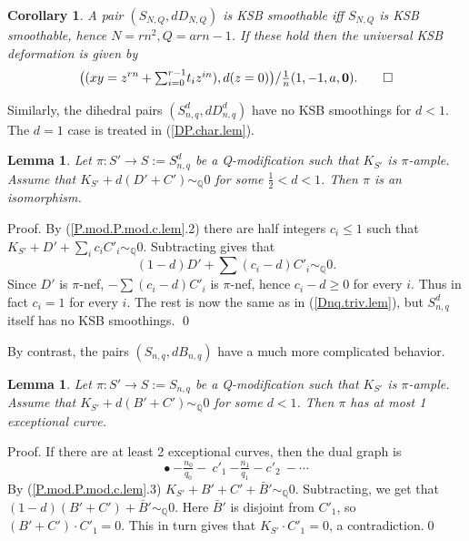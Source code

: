 \documentclass{amsart}
\newtheorem{lem}[thm]{Lemma}
\newtheorem{cor}[thm]{Corollary}
\theoremstyle{definition}
\theoremstyle{remark}
\newcommand{\q}[0]{{\mathbb Q}}
\newcommand{\simq}[0]{\sim_{\q}}
\newcommand{\tsum}[0]{\textstyle{\sum}}
\begin{document}
\begin{cor} \label{34.1.no.defs.thm} A pair 
  $(S_{N,Q}, dD_{N,Q})$ is KSB smoothable iff $S_{N,Q}$ is KSB smoothable, hence
  $N=rn^2, Q=arn-1$. If these hold then
  the universal KSB deformation is given by
  $$
  \bigl((xy=z^{rn}+\tsum_{i=0}^{r-1}t_iz^{in}), d(z=0)\bigr)/\tfrac1{n}(1, -1, a, {\mathbf 0}).
  \hfill\qed
  $$
\end{cor}


Similarly, the dihedral pairs $(S^d_{n,q}, dD^d_{n,q})$ have no KSB smoothings for $d<1$.  The $d=1$ case is treated in (\ref{DP.char.lem}). 

    \begin{lem} \label{Cdnq.triv.lem} Let $\pi:S'\to S:=S^d_{n,q}$ be a Q-modification such that
     $K_{S'}$ is $\pi$-ample. Assume that $K_{S'}+d(D'+C')\simq 0$ for some
     $\frac12< d<1$. Then $\pi$ is an isomorphism.
\end{lem}

     Proof.   By (\ref{P.mod.P.mod.c.lem}.2) there are half integers
     $c_i\leq 1$ such that  $K_{S'}+D'+\sum_i c_iC'_i\simq 0$.
     Subtracting gives that
     $$
     (1-d)D'+\tsum (c_i-d)C'_i\simq 0.
     $$
     Since  $D'$ is $\pi$-nef, $-\tsum (c_i-d)C'_i$ is $\pi$-nef,
     hence $c_i-d\geq 0$ for every $i$.   Thus in fact $c_i=1$ for every $i$.
     The rest is now the same as in (\ref{Dnq.triv.lem}), but $S^d_{n,q}$ itself has no KSB smoothings. \qed






\medskip
By contrast, the pairs  $(S_{n,q}, dB_{n,q})$ have a much more complicated behavior.
   
   \begin{lem} \label{Bnq.almosttriv.lem} Let $\pi:S'\to S:=S_{n,q}$ be a Q-modification such that
     $K_{S'}$ is $\pi$-ample. Assume that $K_{S'}+d(B'+C')\simq 0$ for some
     $ d<1$. Then $\pi$ has at most 1 exceptional curve.
\end{lem}

   Proof.  If there are at least 2 exceptional curves, then 
   the dual graph  is
$$
   \bullet \ {-\boxed{\tfrac{n_0}{q_0}}-} \  c'_1 \  {-\boxed{\tfrac{n_1}{q_1}}-} c'_2 \ - \cdots
   $$
   By (\ref{P.mod.P.mod.c.lem}.3)  $K_{S'}+B'+C'+\bar B'\simq 0$.
   Subtracting, we get that
   $(1-d)(B'+C')+\bar B'\simq 0$.
   Here $\bar B'$ is disjoint from $C'_1$, so
   $(B'+C')\cdot C'_1=0$.  This in turn gives that 
$K_{S'}\cdot C'_1=0$, a contradiction.\qed
\end{document}
